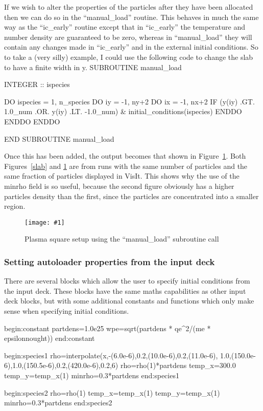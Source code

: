 \documentclass[12pt,a4paper]{article}
\newcommand{\scaledcapimage}[4]
  {{\begin{figure}[hbt!]\centering\texttt{[image: \#1]}\caption{#3}
    \label{#2} \end{figure}}}
\newenvironment{boxverbatim}{\lboxverbatim{none}}{\endlboxverbatim}
\newenvironment{nbboxverbatim}[1]{
\noindent\minipage{\textwidth}
\setlength{\FrameSep}{0pt}
\def\FrameCommand{\fboxsep=0pt \colorbox{shadecolor}}
\MakeFramed{\FrameRestore}
\fvset{label=#1}
\boxverb
}{
\endboxverb
\vspace{-13.5pt}
\endMakeFramed
\endminipage
\vspace{5pt}
}
\begin{document}
If we wish to alter the properties of the particles after they have been
allocated then we can do so in the ``manual\_load'' routine. This behaves
in much the same way as the ``ic\_early'' routine except that in
``ic\_early'' the temperature and number density are guaranteed to be zero,
whereas in ``manual\_load'' they will contain any changes made in ``ic\_early''
and in the external initial conditions. So to take a (very silly) example, I
could use the following code to change the slab to have a finite width in y.
\begin{boxverbatim}
  SUBROUTINE manual_load

    INTEGER :: ispecies

    DO ispecies = 1, n_species
      DO iy = -1, ny+2
        DO ix = -1, nx+2
          IF (y(iy) .GT. 1.0_num .OR. y(iy) .LT. -1.0_num) &
              initial_conditions(ispecies)%
        ENDDO
      ENDDO
    ENDDO

  END SUBROUTINE manual_load
\end{boxverbatim}

Once this has been added, the output becomes that shown in Figure~\ref{square}.
Both Figures~\ref{slab} and \ref{square} are from runs with the same number of
particles and the same fraction of particles displayed in VisIt. This shows
why the use of the minrho field is so useful, because the second figure
obviously has a higher particles density than the first, since the particles
are concentrated into a smaller region.
\scaledcapimage{./images/example2}{square}{Plasma square setup using the
  ``manual\_load'' subroutine call}{0.4}

\subsubsection{Setting autoloader properties from the input deck}
There are several blocks which allow the user to specify initial conditions
from the input deck. These blocks have the same maths capabilities as other
input deck blocks, but with some additional constants and functions which
only make sense when specifying initial conditions.\\

\begin{nbboxverbatim}{none}
begin:constant
   partdens=1.0e25
   wpe=sqrt(partdens * qe^2/(me * epsilonnought))
end:constant

begin:species1
   rho=interpolate(x,-(6.0e-6),0.2,(10.0e-6),0.2,(11.0e-6),
            1.0,(150.0e-6),1.0,(150.5e-6),0.2,(420.0e-6),0.2,6)
   rho=rho(1)*partdens
   temp_x=300.0
   temp_y=temp_x(1)
   minrho=0.3*partdens
end:species1

begin:species2
   rho=rho(1)
   temp_x=temp_x(1)
   temp_y=temp_x(1)
   minrho=0.3*partdens
end:species2
\end{nbboxverbatim}
\end{document}
